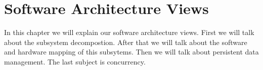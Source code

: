 \chapter{Software Architecture Views}

In this chapter we will explain our software architecture views. First we will talk about the subsystem decompostion. After that we will talk about the software and hardware mapping of this subsytems. Then we will talk about persistent data management. The last subject is \gls{concurrency}.




